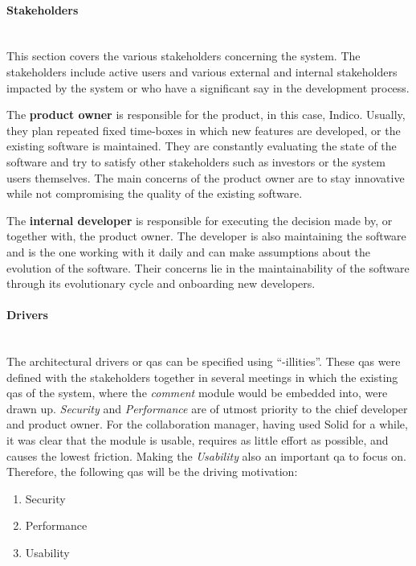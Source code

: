 \paragraph{Stakeholders}\label{poc1-stakeholders}\mbox{}\\

This section covers the various stakeholders concerning the system. The stakeholders include active users and various external and internal stakeholders impacted by the system or who have a significant say in the development process.

The \textbf{product owner} is responsible for the product, in this case, Indico. Usually, they plan repeated fixed time-boxes in which new features are developed, or the existing software is maintained. They are constantly evaluating the state of the software and try to satisfy other stakeholders such as investors or the system users themselves. The main concerns of the product owner are to stay innovative while not compromising the quality of the existing software.

The \textbf{internal developer} is responsible for executing the decision made by, or together with, the product owner. The developer is also maintaining the software and is the one working with it daily and can make assumptions about the evolution of the software. Their concerns lie in the maintainability of the software through its evolutionary cycle and onboarding new developers.
\vspace{0.5cm}
\paragraph{Drivers}\mbox{}\\

The architectural drivers or \glspl{qa} can be specified using “-illities”. These \glspl{qa} were defined with the stakeholders together in several meetings in which the existing \glspl{qa} of the system, where the \textit{comment} module would be embedded into, were drawn up. \textit{Security} and \textit{Performance} are of utmost priority to the chief developer and product owner. For the collaboration manager, having used Solid for a while, it was clear that the module is usable, requires as little effort as possible, and causes the lowest friction. Making the \textit{Usability} also an important \gls{qa} to focus on. Therefore, the following \glspl{qa} will be the driving motivation:

\begin{enumerate}
    \item Security
    \item Performance
    \item Usability
\end{enumerate}

